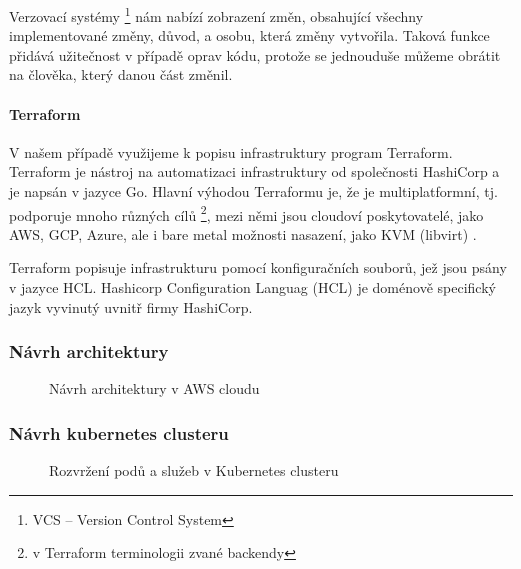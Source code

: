 \documentclass[thesis=M,czech]{FITthesis}[2019/12/23]
\theoremstyle{plain}
\theoremstyle{definition}
\begin{document}
Verzovací systémy \footnote{VCS -- Version Control System} nám nabízí zobrazení změn, obsahující všechny implementované změny, důvod, a osobu, která změny vytvořila. Taková funkce přidává užitečnost v případě oprav kódu, protože se jednouduše můžeme obrátit na člověka, který danou část změnil. 

\paragraph{Terraform}

V našem případě využijeme k popisu infrastruktury program Terraform. Terraform je nástroj na automatizaci infrastruktury od společnosti HashiCorp a je napsán v jazyce Go. Hlavní výhodou Terraformu je, že je multiplatformní, tj. podporuje mnoho různých cílů \footnote{v Terraform terminologii zvané backendy}, mezi němi jsou  cloudoví poskytovatelé, jako AWS, GCP, Azure, ale i bare metal  možnosti nasazení, jako KVM (libvirt) \cite{tf-libvirt}.


Terraform popisuje infrastrukturu pomocí konfiguračních souborů, jež jsou psány v jazyce HCL. Hashicorp Configuration Languag (HCL) je doménově specifický jazyk vyvinutý uvnitř firmy HashiCorp.

\subsubsection{Návrh architektury}


\begin{figure}[H]\centering
	

	\caption[Návrh architektury v AWS cloudu]{Návrh architektury v AWS cloudu}\label{fig:float}
\end{figure}


\subsubsection{Návrh kubernetes clusteru}

\begin{figure}[H]\centering
	

	\caption[Rozvržení podů a služeb v Kubernetes clusteru]{Rozvržení podů a služeb v Kubernetes clusteru}\label{fig:float}
\end{figure}
\end{document}
